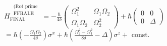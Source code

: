 \documentclass[10pt]{article}
\begin{document}
$H_{\text {FINAL }}^{\substack{\text { (Rot prime } \\ \text { FFRALE }}}=-\frac{\hbar}{4 \delta}\left(\begin{array}{cc}\Omega_{1}^{2} & \Omega_{1} \Omega_{2} \\ \Omega_{1} \Omega_{2} & \Omega_{2}^{2}\end{array}\right)+\hbar\left(\begin{array}{cc}0 & 0 \\ 0 & \Delta\end{array}\right)$\\
$=\hbar\left(-\frac{\Omega_{1} \Omega_{2}}{4 \delta}\right) \sigma^{x}+\hbar\left(\frac{\Omega_{2}^{2}-\Omega_{1}^{2}}{8 \delta}-\Delta\right) \sigma^{z}+$ const.
\end{document}
